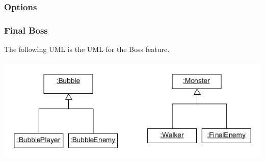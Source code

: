 \subsubsection{Options}

\subsubsection{Final Boss}

The following UML is the UML for the Boss feature.
\\\\
\includegraphics[width=150mm]{FinalEnemyUml.png}



